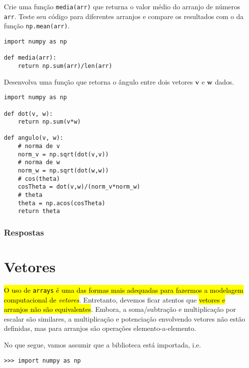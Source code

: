 \begin{exer}
  Crie uma função \lstinline+media(arr)+ que returna o valor médio do arranjo de números \lstinline+arr+. Teste seu código para diferentes arranjos e compare os resultados com o da função \lstinline+np.mean(arr)+.
\end{exer}
\begin{resp}
\begin{lstlisting}
import numpy as np

def media(arr):
    return np.sum(arr)/len(arr)
\end{lstlisting}
\end{resp}

\begin{exer}
  Desenvolva uma função que retorna o ângulo entre dois vetores $\pmb{v}$ e $\pmb{w}$ dados.
\end{exer}
\begin{resp}
\begin{lstlisting}
import numpy as np

def dot(v, w):
    return np.sum(v*w)

def angulo(v, w):
    # norma de v
    norm_v = np.sqrt(dot(v,v))
    # norma de w
    norm_w = np.sqrt(dot(w,w))
    # cos(theta)
    cosTheta = dot(v,w)/(norm_v*norm_w)
    # theta
    theta = np.acos(cosTheta)
    return theta
\end{lstlisting}
\end{resp}

\ifisbook
\subsubsection{Respostas}
\shipoutAnswer
\fi


\section{Vetores}\label{cap_arr_sec_vetor}

\hl{O uso de {\lstinline+arrays+} é uma das formas mais adequadas para fazermos a modelagem computacional de \emph{vetores}}. Entretanto, devemos ficar atentos que \hl{vetores e arranjos não são equivalentes}. Embora, a soma/subtração e multiplicação por escalar são similares, a multiplicação e potenciação envolvendo vetores não estão definidas, mas para arranjos são operações elemento-a-elemento.

No que segue, vamos assumir que a biblioteca {\numpy} está importada, i.e.
\begin{lstlisting}
>>> import numpy as np
\end{lstlisting}


